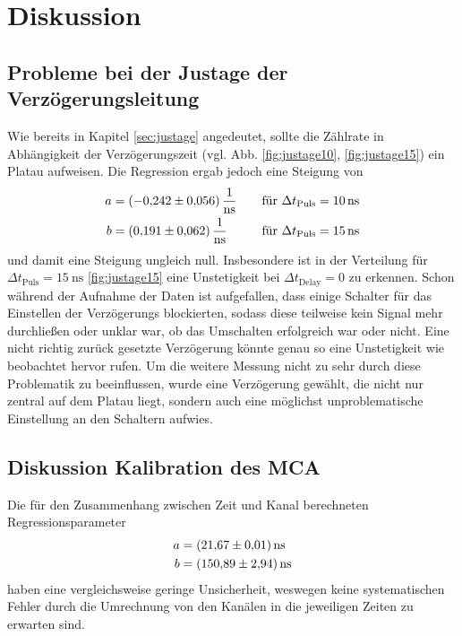 \section{Diskussion}
\label{sec:Diskussion}

\subsection*{Probleme bei der Justage der Verzögerungsleitung}
Wie bereits in Kapitel \ref{sec:justage} angedeutet, sollte die Zählrate in Abhängigkeit der Verzögerungszeit (vgl. Abb. \ref{fig:justage10}, \ref*{fig:justage15})
ein Platau aufweisen. Die Regression ergab jedoch eine Steigung von 
\begin{align*}
    a&=\SI{-0.242 \pm 0.056}{\per\nano\second} \quad &\text{für $\Delta t_{\text{Puls}}=\SI{10}{\nano\second}$}\\
    b&=\SI{0.191 \pm 0.062 }{\per\nano\second} \quad &\text{für $\Delta t_{\text{Puls}}=\SI{15}{\nano\second}$}
\end{align*}
und damit eine Steigung ungleich null. Insbesondere ist in der Verteilung für $\Delta t_{\text{Puls}}=\SI{15}{\nano\second}$ \ref{fig:justage15} eine 
Unstetigkeit bei $\Delta t_\text{Delay}=0$ zu erkennen. Schon während der Aufnahme der Daten ist aufgefallen, dass einige Schalter für das Einstellen der Verzögerungs
blockierten, sodass diese teilweise kein Signal mehr durchließen oder unklar war, ob das Umschalten erfolgreich war oder nicht. Eine nicht richtig zurück
gesetzte Verzögerung könnte genau so eine Unstetigkeit wie beobachtet hervor rufen. Um die weitere Messung nicht zu sehr durch diese Problematik zu beeinflussen,
wurde eine Verzögerung gewählt, die nicht nur zentral auf dem Platau liegt, sondern auch eine möglichst unproblematische Einstellung an den Schaltern aufwies.

\subsection*{Diskussion Kalibration des MCA}
Die für den Zusammenhang zwischen Zeit und Kanal berechneten Regressionsparameter 
\begin{align*}
    a &= \SI{21.67 \pm 0.01}{\nano\second} \\ 
    b &= \SI{150.89 \pm 2.94}{\nano\second}
 \end{align*}
haben eine vergleichsweise geringe Unsicherheit, weswegen keine systematischen Fehler durch die Umrechnung von den Kanälen in die jeweiligen Zeiten zu erwarten sind. 

